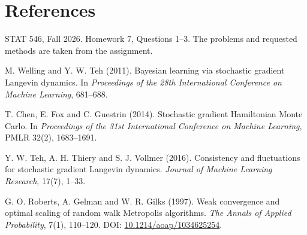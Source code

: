 \documentclass[11pt]{article}
\begin{document}
\section*{References}
\sloppy

STAT 546, Fall 2026. Homework 7, Questions 1--3. The problems and requested methods are taken from the assignment.

M. Welling and Y. W. Teh (2011). Bayesian learning via stochastic gradient Langevin dynamics. In
\emph{Proceedings of the 28th International Conference on Machine Learning}, 681--688.

T. Chen, E. Fox and C. Guestrin (2014). Stochastic gradient Hamiltonian Monte Carlo. In \emph{Proceedings of
the 31st International Conference on Machine Learning}, PMLR 32(2), 1683--1691.

Y. W. Teh, A. H. Thiery and S. J. Vollmer (2016). Consistency and fluctuations for stochastic gradient Langevin
dynamics. \emph{Journal of Machine Learning Research}, 17(7), 1--33.

G. O. Roberts, A. Gelman and W. R. Gilks (1997). Weak convergence and optimal scaling of random walk Metropolis
algorithms. \emph{The Annals of Applied Probability}, 7(1), 110--120.
DOI: \href{https://doi.org/10.1214/aoap/1034625254}{10.1214/aoap/1034625254}.
\end{document}

